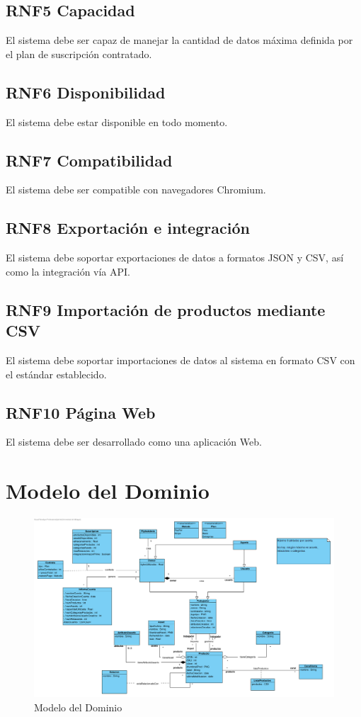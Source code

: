 \documentclass[12pt.a4paper]{article}
\begin{document}
\subsection*{RNF5 Capacidad}
El sistema debe ser capaz de manejar la cantidad de datos máxima definida por el plan de suscripción contratado.

\subsection*{RNF6 Disponibilidad}
El sistema debe estar disponible en todo momento.

\subsection*{RNF7 Compatibilidad}
El sistema debe ser compatible con navegadores Chromium.

\subsection*{RNF8 Exportación e integración}
El sistema debe soportar exportaciones de datos a formatos JSON y CSV, así como la integración vía API.

\subsection*{RNF9 Importación de productos mediante CSV}
El sistema debe soportar importaciones de datos al sistema en formato CSV con el estándar establecido.


\subsection*{RNF10 Página Web}
El sistema debe ser desarrollado como una aplicación Web.

\section{Modelo del Dominio}

\begin{figure}[h]   
    \centering
    \includegraphics[width=1\textwidth]{modelo.png}
    \caption{Modelo del Dominio}
    \label{fig:mi_imagen}
\end{figure}
\end{document}
